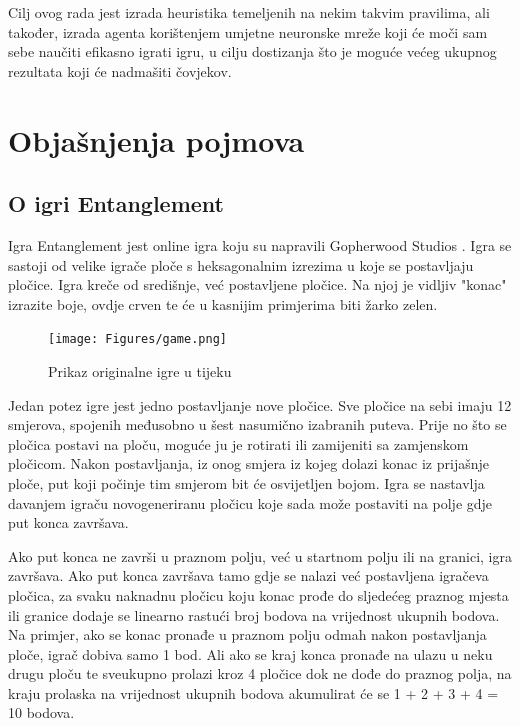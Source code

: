 \documentclass[zavrsnirad]{fer}
\begin{document}
Cilj ovog rada jest izrada heuristika temeljenih na nekim takvim pravilima, ali također, izrada agenta korištenjem umjetne neuronske mreže koji će moči sam sebe naučiti efikasno igrati igru, u cilju dostizanja što je moguće većeg ukupnog rezultata koji će nadmašiti čovjekov.



\chapter{Objašnjenja pojmova}
\label{pog:glavni_dio}

\section{O igri Entanglement}
\label{pog:o_igri}


Igra Entanglement jest online igra koju su napravili Gopherwood Studios \cite{gopherwoodstudios}. Igra se sastoji od velike igrače ploče s heksagonalnim izrezima u koje se postavljaju pločice. Igra kreče od središnje, već postavljene pločice. Na njoj je vidljiv "konac" izrazite boje, ovdje crven te će u kasnijim primjerima biti žarko zelen.

\begin{figure}[htb]
	\centering
	\texttt{[image: Figures/game.png]} 
	\caption{Prikaz originalne igre u tijeku}
	\label{slk:game_screen}
\end{figure}

Jedan potez igre jest jedno postavljanje nove pločice. Sve pločice na sebi imaju 12 smjerova, spojenih međusobno u šest nasumično izabranih puteva. Prije no što se pločica postavi na ploču, moguće ju je rotirati ili zamijeniti sa zamjenskom pločicom. Nakon postavljanja, iz onog smjera iz kojeg dolazi konac iz prijašnje ploče, put koji počinje tim smjerom bit će osvijetljen bojom. Igra se nastavlja davanjem igraču novogeneriranu pločicu koje sada može postaviti na polje gdje put konca završava.

Ako put konca ne završi u praznom polju, već u startnom polju ili na granici, igra završava. Ako put konca završava tamo gdje se nalazi već postavljena igračeva pločica, za svaku naknadnu pločicu koju konac prođe do sljedećeg praznog mjesta ili granice dodaje se linearno rastući broj bodova na vrijednost ukupnih bodova. Na primjer, ako se konac pronađe u praznom polju odmah nakon postavljanja ploče, igrač dobiva samo 1 bod. Ali ako se kraj konca pronađe na ulazu u neku drugu ploču te sveukupno prolazi kroz 4 pločice dok ne dođe do praznog polja, na kraju prolaska na vrijednost ukupnih bodova akumulirat će se 1 + 2 + 3 + 4 = 10 bodova.
\end{document}
